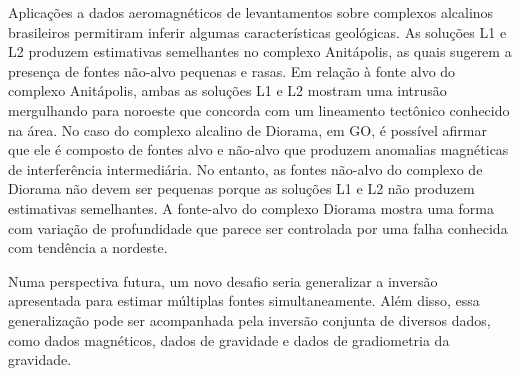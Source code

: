 Aplicações a dados aeromagnéticos de levantamentos sobre complexos alcalinos brasileiros permitiram inferir algumas características geológicas.
As soluções L1 e L2 produzem estimativas semelhantes no complexo Anitápolis, as quais sugerem a presença de fontes não-alvo pequenas e rasas.
Em relação à fonte alvo do complexo Anitápolis, ambas as soluções L1 e L2 mostram uma intrusão mergulhando para noroeste que concorda com um lineamento tectônico conhecido na área.
No caso do complexo alcalino de Diorama, em GO, é possível afirmar que ele é composto de fontes alvo e não-alvo que produzem anomalias magnéticas de interferência intermediária.
No entanto, as fontes não-alvo do complexo de Diorama não devem ser pequenas porque as soluções L1 e L2 não produzem estimativas semelhantes.
A fonte-alvo do complexo Diorama mostra uma forma com variação de profundidade que parece ser controlada por uma falha conhecida com tendência a nordeste.

Numa perspectiva futura, um novo desafio seria generalizar a inversão apresentada para estimar múltiplas fontes simultaneamente.
Além disso, essa generalização pode ser acompanhada pela inversão conjunta de diversos dados, como dados magnéticos, dados de gravidade e dados de gradiometria da gravidade.